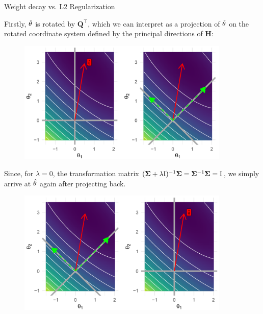 \begin{vbframe}{Weight decay vs. L2 Regularization}
\framebreak

\begin{footnotesize}
Firstly, $\hat{\theta}$ is rotated by $\bm{Q}^{\top}$, which we can interpret as a projection of $\hat{\theta}$ on the rotated coordinate system defined by the principal directions of $\bm{H}$:
\end{footnotesize}

\begin{figure}
\includegraphics[width=0.9\textwidth]{figure_man/L2-regularization03.png}\\
\end{figure}

\framebreak

\begin{footnotesize}
Since, for $\lambda = 0$, the transformation matrix $(\bm{\Sigma} + \lambda \mathrm{I})^{-1} \bm{\Sigma} = \bm{\Sigma}^{-1} \bm{\Sigma} = \mathrm{I}$, we simply arrive at $\hat{\theta}$ again after projecting back.
\end{footnotesize}

\begin{figure}
\includegraphics[width=0.9\textwidth]{figure_man/L2-regularization04.png}\\
\end{figure}



\end{vbframe}
